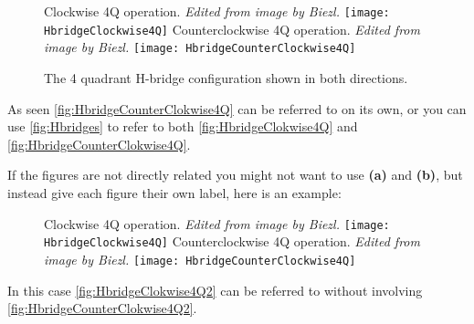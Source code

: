 \begin{figure}[H]
    \subcaptionbox  %
    {               %
      Clockwise 4Q operation.\newline                              %
      \emph{Edited from image by Biezl.\cite{Biezl}}                %
      \label{fig:HbridgeClokwise4Q}                                  %
    }                                                                 %
    {                                                                  %
      \texttt{[image: HbridgeClockwise4Q]}         %
    }                                                                    %
    \hspace{5pt}                                                          %
    \subcaptionbox  %
    {                                                                       %
      Counterclockwise 4Q operation.\newline                                 %
      \emph{Edited from image by Biezl.\cite{Biezl}}                          %
      \label{fig:HbridgeCounterClokwise4Q}                                     %
    }                                                                           %
    {                                                                            %
      \texttt{[image: HbridgeCounterClockwise4Q]}            %
    }                                                                             %
    \caption{The 4 quadrant H-bridge configuration shown in both directions.}%
    \label{fig:Hbridges}
\end{figure}

As seen \autoref{fig:HbridgeCounterClokwise4Q} can be referred to on its own, or you can use \autoref{fig:Hbridges} to refer to both \autoref{fig:HbridgeClokwise4Q} and \autoref{fig:HbridgeCounterClokwise4Q}.

If the figures are not directly related you might not want to use \textbf{(a)} and \textbf{(b)}, but instead give each figure their own label, here is an example:

\begin{figure}[H]
    \captionbox
    {
      Clockwise 4Q operation.\newline
      \emph{Edited from image by Biezl.\cite{Biezl}}
      \label{fig:HbridgeClokwise4Q2}
    }
    {
      \texttt{[image: HbridgeClockwise4Q]}
    }
    \hspace{5pt}
    \captionbox
    {
      Counterclockwise 4Q operation.\newline
      \emph{Edited from image by Biezl.\cite{Biezl}}
      \label{fig:HbridgeCounterClokwise4Q2}
    }
    {
      \texttt{[image: HbridgeCounterClockwise4Q]}
    }
\end{figure}

In this case \autoref{fig:HbridgeClokwise4Q2} can be referred to without involving \autoref{fig:HbridgeCounterClokwise4Q2}.

\pagebreak